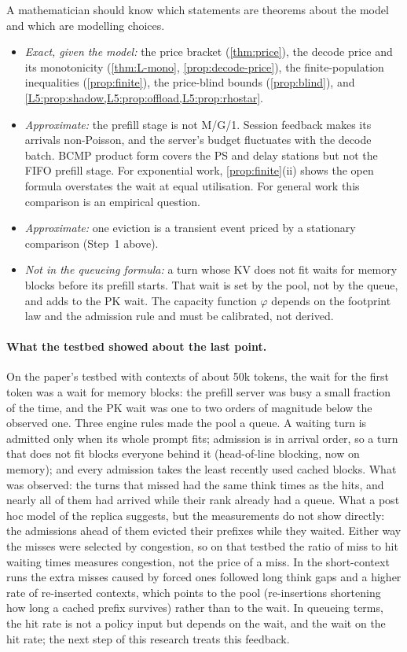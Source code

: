 A mathematician should know which statements are theorems about the model
and which are modelling choices.

\begin{itemize}
\item \emph{Exact, given the model:} the price bracket (\cref{thm:price}),
  the decode price and its monotonicity (\cref{thm:L-mono},
  \cref{prop:decode-price}), the finite-population inequalities
  (\cref{prop:finite}), the price-blind bounds (\cref{prop:blind}), and
  \cref{L5:prop:shadow,L5:prop:offload,L5:prop:rhostar}.
\item \emph{Approximate:} the prefill stage is not M/G/1. Session feedback
  makes its arrivals non-Poisson, and the server's budget fluctuates with
  the decode batch. BCMP product form covers the PS and delay stations but
  not the FIFO prefill stage. For exponential work,
  \cref{prop:finite}(ii) shows the open formula overstates the wait at
  equal utilisation. For general work this comparison is an empirical
  question.
\item \emph{Approximate:} one eviction is a transient event priced by a
  stationary comparison (Step~1 above).
\item \emph{Not in the queueing formula:} a turn whose KV does not fit
  waits for memory blocks before its prefill starts. That wait is set by
  the pool, not by the queue, and adds to the PK wait. The capacity
  function $\varphi$ depends on the footprint law and the admission rule
  and must be calibrated, not derived.
\end{itemize}

\paragraph{What the testbed showed about the last point.} On the paper's testbed
with contexts of about 50k tokens, the wait for the first token was a wait for memory
blocks: the prefill server was busy a small fraction of the time, and the PK wait was
one to two orders of magnitude below the observed one. Three engine rules made the
pool a queue. A waiting turn is admitted only when its whole prompt fits; admission is
in arrival order, so a turn that does not fit blocks everyone behind it (head-of-line
blocking, now on memory); and every admission takes the least recently used cached
blocks. What was observed: the turns that missed had the same think times as the hits,
and nearly all of them had arrived while their rank already had a queue. What a
post hoc model of the replica suggests, but the measurements do not show directly: the
admissions ahead of them evicted their prefixes while they waited. Either way the
misses were selected by congestion, so on that testbed the ratio of miss to hit waiting
times measures congestion, not the price of a miss. In the short-context runs the extra
misses caused by forced ones followed long think gaps and a higher rate of re-inserted
contexts, which points to the pool (re-insertions shortening how long a cached prefix
survives) rather than to the wait.
In queueing terms, the hit rate is not a policy input but depends on the wait, and the
wait on the hit rate; the next step of this research treats this
feedback.

